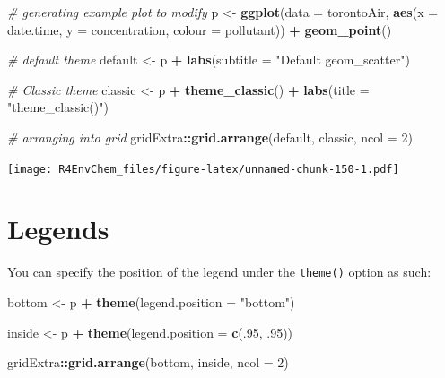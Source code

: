 \documentclass[
]{book}
\newenvironment{Shaded}{\begin{snugshade}}{\end{snugshade}}
\newcommand{\AttributeTok}[1]{\textcolor[rgb]{0.13,0.29,0.53}{#1}}
\newcommand{\CommentTok}[1]{\textcolor[rgb]{0.56,0.35,0.01}{\textit{#1}}}
\newcommand{\DecValTok}[1]{\textcolor[rgb]{0.00,0.00,0.81}{#1}}
\newcommand{\FunctionTok}[1]{\textcolor[rgb]{0.13,0.29,0.53}{\textbf{#1}}}
\newcommand{\NormalTok}[1]{#1}
\newcommand{\OtherTok}[1]{\textcolor[rgb]{0.56,0.35,0.01}{#1}}
\newcommand{\SpecialCharTok}[1]{\textcolor[rgb]{0.81,0.36,0.00}{\textbf{#1}}}
\newcommand{\StringTok}[1]{\textcolor[rgb]{0.31,0.60,0.02}{#1}}
\begin{document}
\begin{Shaded}
\begin{Highlighting}[]
\CommentTok{\# generating example plot to modify }
\NormalTok{p }\OtherTok{\textless{}{-}} \FunctionTok{ggplot}\NormalTok{(}\AttributeTok{data =}\NormalTok{ torontoAir, }
       \FunctionTok{aes}\NormalTok{(}\AttributeTok{x =}\NormalTok{ date.time,}
           \AttributeTok{y =}\NormalTok{ concentration,}
           \AttributeTok{colour =}\NormalTok{ pollutant)) }\SpecialCharTok{+}
  \FunctionTok{geom\_point}\NormalTok{() }

\CommentTok{\# default theme}
\NormalTok{default }\OtherTok{\textless{}{-}}\NormalTok{ p }\SpecialCharTok{+} \FunctionTok{labs}\NormalTok{(}\AttributeTok{subtitle =} \StringTok{"Default geom\_scatter"}\NormalTok{)}


\CommentTok{\# Classic theme}
\NormalTok{classic }\OtherTok{\textless{}{-}}\NormalTok{ p }\SpecialCharTok{+} 
  \FunctionTok{theme\_classic}\NormalTok{() }\SpecialCharTok{+}
  \FunctionTok{labs}\NormalTok{(}\AttributeTok{title =} \StringTok{"theme\_classic()"}\NormalTok{)}
 

\CommentTok{\# arranging into grid}
\NormalTok{gridExtra}\SpecialCharTok{::}\FunctionTok{grid.arrange}\NormalTok{(default, classic, }\AttributeTok{ncol =} \DecValTok{2}\NormalTok{)}
\end{Highlighting}
\end{Shaded}

\texttt{[image: R4EnvChem\_files/figure-latex/unnamed-chunk-150-1.pdf]}

\hypertarget{legends}{%
\section{Legends}\label{legends}}

You can specify the position of the legend under the \texttt{theme()} option as such:

\begin{Shaded}
\begin{Highlighting}[]
\NormalTok{bottom }\OtherTok{\textless{}{-}}\NormalTok{ p }\SpecialCharTok{+} \FunctionTok{theme}\NormalTok{(}\AttributeTok{legend.position =} \StringTok{"bottom"}\NormalTok{)}

\NormalTok{inside }\OtherTok{\textless{}{-}}\NormalTok{ p }\SpecialCharTok{+} \FunctionTok{theme}\NormalTok{(}\AttributeTok{legend.position =} \FunctionTok{c}\NormalTok{(.}\DecValTok{95}\NormalTok{, .}\DecValTok{95}\NormalTok{))}

\NormalTok{gridExtra}\SpecialCharTok{::}\FunctionTok{grid.arrange}\NormalTok{(bottom, inside, }\AttributeTok{ncol =} \DecValTok{2}\NormalTok{)}
\end{Highlighting}
\end{Shaded}
\end{document}
